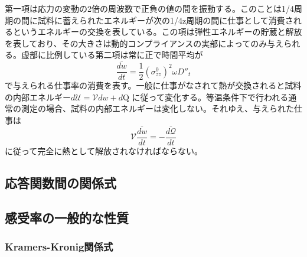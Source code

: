第一項は応力の変動の2倍の周波数で正負の値の間を振動する。このことは1/4周期の間に試料に蓄えられたエネルギーが次の1/4z周期の間に仕事として消費されるというエネルギーの交換を表している。この項は弾性エネルギーの貯蔵と解放を表しており、その大きさは動的コンプライアンスの実部によってのみ与えられる。虚部に比例している第二項は常に正で時間平均が
\begin{equation}
    \overline{\frac{dw}{dt}} = \frac{1}{2}(\sigma_{zz}^0)^2\omega D''_t
\end{equation}
で与えられる仕事率の消費を表す。一般に仕事がなされて熱が交換されると試料の内部エネルギー$d\mathcal{U} = \mathcal{V}dw+d\mathrm{Q}$
に従って変化する。等温条件下で行われる通常の測定の場合、試料の内部エネルギーは変化しない。それゆえ、与えられた仕事は
\begin{equation}
    \mathcal{V}\overline{\frac{dw}{dt}} = - \overline{\frac{d\mathcal{Q}}{dt}}
\end{equation}
に従って完全に熱として解放されなければならない。
\subsection{応答関数間の関係式}
\subsection{感受率の一般的な性質}
\subsubsection{Kramers-Kronig関係式}